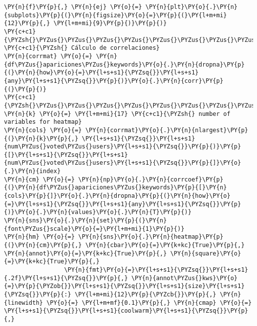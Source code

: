     \begin{tcolorbox}[breakable, size=fbox, boxrule=1pt, pad at break*=1mm,colback=cellbackground, colframe=cellborder]
\begin{Verbatim}[commandchars=\\\{\}]
\PY{n}{f}\PY{p}{,} \PY{n}{ej} \PY{o}{=} \PY{n}{plt}\PY{o}{.}\PY{n}{subplots}\PY{p}{(}\PY{n}{figsize}\PY{o}{=}\PY{p}{(}\PY{l+m+mi}{12}\PY{p}{,} \PY{l+m+mi}{9}\PY{p}{)}\PY{p}{)}
\PY{c+c1}{\PYZsh{}\PYZus{}\PYZus{}\PYZus{}\PYZus{}\PYZus{}\PYZus{}\PYZus{}\PYZus{}\PYZus{}\PYZus{}\PYZus{}\PYZus{}\PYZus{}\PYZus{}\PYZus{}\PYZus{}\PYZus{}\PYZus{}\PYZus{}\PYZus{}\PYZus{}\PYZus{}\PYZus{}\PYZus{}\PYZus{}\PYZus{}\PYZus{}\PYZus{}\PYZus{}}
\PY{c+c1}{\PYZsh{} Cálculo de correlaciones}
\PY{n}{corrmat} \PY{o}{=} \PY{n}{df\PYZus{}apariciones\PYZus{}keywords}\PY{o}{.}\PY{n}{dropna}\PY{p}{(}\PY{n}{how}\PY{o}{=}\PY{l+s+s1}{\PYZsq{}}\PY{l+s+s1}{any}\PY{l+s+s1}{\PYZsq{}}\PY{p}{)}\PY{o}{.}\PY{n}{corr}\PY{p}{(}\PY{p}{)}
\PY{c+c1}{\PYZsh{}\PYZus{}\PYZus{}\PYZus{}\PYZus{}\PYZus{}\PYZus{}\PYZus{}\PYZus{}\PYZus{}\PYZus{}\PYZus{}\PYZus{}\PYZus{}\PYZus{}\PYZus{}\PYZus{}\PYZus{}\PYZus{}\PYZus{}\PYZus{}\PYZus{}\PYZus{}\PYZus{}\PYZus{}\PYZus{}\PYZus{}\PYZus{}\PYZus{}\PYZus{}\PYZus{}\PYZus{}\PYZus{}\PYZus{}\PYZus{}\PYZus{}\PYZus{}\PYZus{}\PYZus{}\PYZus{}\PYZus{}}
\PY{n}{k} \PY{o}{=} \PY{l+m+mi}{17} \PY{c+c1}{\PYZsh{} number of variables for heatmap}
\PY{n}{cols} \PY{o}{=} \PY{n}{corrmat}\PY{o}{.}\PY{n}{nlargest}\PY{p}{(}\PY{n}{k}\PY{p}{,} \PY{l+s+s1}{\PYZsq{}}\PY{l+s+s1}{num\PYZus{}voted\PYZus{}users}\PY{l+s+s1}{\PYZsq{}}\PY{p}{)}\PY{p}{[}\PY{l+s+s1}{\PYZsq{}}\PY{l+s+s1}{num\PYZus{}voted\PYZus{}users}\PY{l+s+s1}{\PYZsq{}}\PY{p}{]}\PY{o}{.}\PY{n}{index}
\PY{n}{cm} \PY{o}{=} \PY{n}{np}\PY{o}{.}\PY{n}{corrcoef}\PY{p}{(}\PY{n}{df\PYZus{}apariciones\PYZus{}keywords}\PY{p}{[}\PY{n}{cols}\PY{p}{]}\PY{o}{.}\PY{n}{dropna}\PY{p}{(}\PY{n}{how}\PY{o}{=}\PY{l+s+s1}{\PYZsq{}}\PY{l+s+s1}{any}\PY{l+s+s1}{\PYZsq{}}\PY{p}{)}\PY{o}{.}\PY{n}{values}\PY{o}{.}\PY{n}{T}\PY{p}{)}
\PY{n}{sns}\PY{o}{.}\PY{n}{set}\PY{p}{(}\PY{n}{font\PYZus{}scale}\PY{o}{=}\PY{l+m+mi}{1}\PY{p}{)}
\PY{n}{hm} \PY{o}{=} \PY{n}{sns}\PY{o}{.}\PY{n}{heatmap}\PY{p}{(}\PY{n}{cm}\PY{p}{,} \PY{n}{cbar}\PY{o}{=}\PY{k+kc}{True}\PY{p}{,} \PY{n}{annot}\PY{o}{=}\PY{k+kc}{True}\PY{p}{,} \PY{n}{square}\PY{o}{=}\PY{k+kc}{True}\PY{p}{,}
                 \PY{n}{fmt}\PY{o}{=}\PY{l+s+s1}{\PYZsq{}}\PY{l+s+s1}{.2f}\PY{l+s+s1}{\PYZsq{}}\PY{p}{,} \PY{n}{annot\PYZus{}kws}\PY{o}{=}\PY{p}{\PYZob{}}\PY{l+s+s1}{\PYZsq{}}\PY{l+s+s1}{size}\PY{l+s+s1}{\PYZsq{}}\PY{p}{:} \PY{l+m+mi}{12}\PY{p}{\PYZcb{}}\PY{p}{,} \PY{n}{linewidth} \PY{o}{=} \PY{l+m+mf}{0.1}\PY{p}{,} \PY{n}{cmap} \PY{o}{=} \PY{l+s+s1}{\PYZsq{}}\PY{l+s+s1}{coolwarm}\PY{l+s+s1}{\PYZsq{}}\PY{p}{,}

\end{Verbatim}
\end{tcolorbox}
